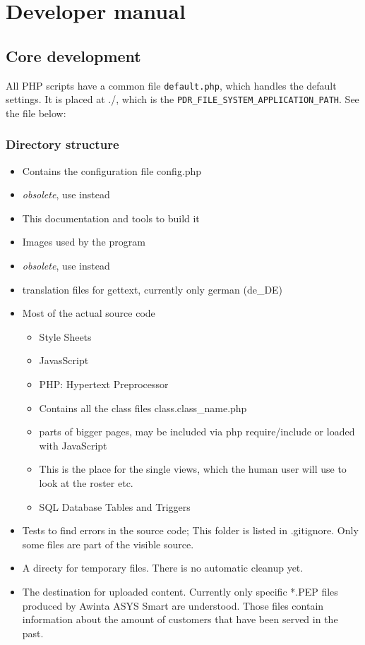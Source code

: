 
\chapter{Developer manual}
\section{Core development}
All PHP scripts have a common file \texttt{default.php}, which handles the default settings. It is placed at ./, which is the \texttt{PDR\_FILE\_SYSTEM\_APPLICATION\_PATH}.
See the file below:


\subsection{Directory structure}
\begin{itemize}
\item {} Contains the configuration file config.php
\item {} \emph{obsolete}, use  instead
\item {} This documentation and tools to build it
\item {} Images used by the program
\item {}  \emph{obsolete}, use  instead
\item {} translation files for gettext, currently only german (de\_DE)
\item {} Most of the actual source code
    \begin{itemize}
    \item {} Style Sheets
    \item {} JavasScript
    \item {} PHP: Hypertext Preprocessor
    \item {} Contains all the class files class.class\_name.php
    \item {} parts of bigger pages, may be included via php require/include or loaded with JavaScript
    \item {} This is the place for the single views, which the human user will use to look at the roster etc.
    \item {} SQL Database Tables and Triggers
    \end{itemize}
\item {} Tests to find errors in the source code; This folder is listed in .gitignore. Only some files are part of the visible source.
\item {} A directy for temporary files. There is no automatic cleanup yet.
\item {} The destination for uploaded content. Currently only specific *.PEP files produced by Awinta ASYS Smart are understood. Those files contain information about the amount of customers that have been served in the past.
\end{itemize}
